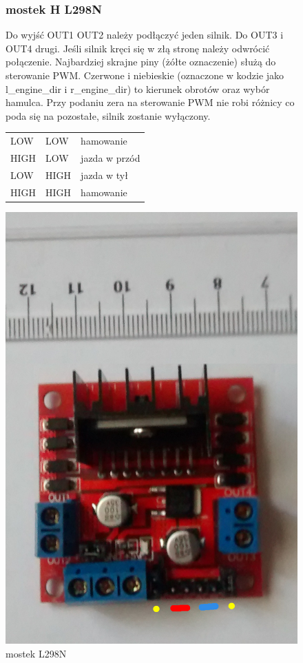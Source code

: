 \documentclass[a4paper,11pt]{article}
\def\SCALE{0.6}
\begin{document}
\begin{figure}[H]
	\subsubsection{mostek H L298N}
	Do wyjść OUT1 OUT2 należy podłączyć jeden silnik. Do OUT3 i OUT4 drugi. Jeśli silnik kręci się w złą stronę należy odwrócić połączenie.
	Najbardziej skrajne piny (żółte oznaczenie) służą do sterowanie PWM. Czerwone i niebieskie (oznaczone w kodzie jako l\_engine\_dir i r\_engine\_dir) to kierunek obrotów oraz wybór hamulca. Przy podaniu zera na sterowanie PWM nie robi różnicy co poda się na pozostałe, silnik zostanie wyłączony.
	
	\begin{tabular}{|l|l|l|}
		\hline
		LOW & LOW & hamowanie \\
		HIGH & LOW & jazda w przód \\
		LOW & HIGH & jazda w tył \\
		HIGH & HIGH & hamowanie \\
		\hline				
	
	\end{tabular}
	\centering
	\includegraphics[width=\SCALE
	\paperwidth]{mostek}
	\caption{mostek L298N}
\end{figure}
\end{document}
